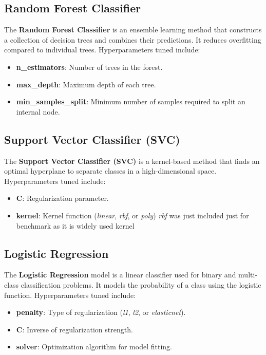 \documentclass{article}
\begin{document}
\subsection{Random Forest Classifier}
The \textbf{Random Forest Classifier} is an ensemble learning method that constructs a collection of decision trees and combines their predictions. It reduces overfitting compared to individual trees. Hyperparameters tuned include:
\begin{itemize}
    \item \textbf{n\_estimators}: Number of trees in the forest.
    \item \textbf{max\_depth}: Maximum depth of each tree.
    \item \textbf{min\_samples\_split}: Minimum number of samples required to split an internal node.
\end{itemize}

\subsection{Support Vector Classifier (SVC)}
The \textbf{Support Vector Classifier (SVC)} is a kernel-based method that finds an optimal hyperplane to separate classes in a high-dimensional space. Hyperparameters tuned include:
\begin{itemize}
    \item \textbf{C}: Regularization parameter.
    \item \textbf{kernel}: Kernel function (\textit{linear}, \textit{rbf}, or \textit{poly})  \textit{rbf} was just included 
    just for benchmark as it is widely used kernel
\end{itemize}

\subsection{Logistic Regression}
The \textbf{Logistic Regression} model is a linear classifier used for binary and multi-class classification problems. It models the probability of a class using the logistic function. Hyperparameters tuned include:
\begin{itemize}
    \item \textbf{penalty}: Type of regularization (\textit{l1}, \textit{l2}, or \textit{elasticnet}).
    \item \textbf{C}: Inverse of regularization strength.
    \item \textbf{solver}: Optimization algorithm for model fitting.
\end{itemize}
\end{document}
